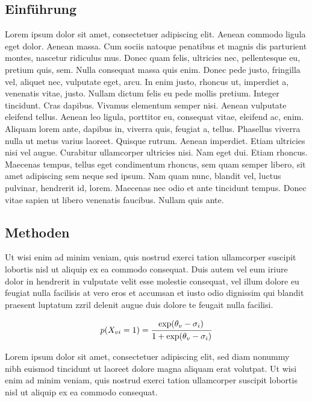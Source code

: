\documentclass[a1paper]{article}
\begin{document}
\begin{posterbox}
	\vspace{-10mm}
	\raggedright

	\section*{Einführung}
	Lorem ipsum dolor sit amet, consectetuer adipiscing elit. Aenean commodo ligula eget dolor. Aenean massa. Cum sociis natoque penatibus et magnis dis parturient montes, nascetur ridiculus mus. Donec quam felis, ultricies nec, pellentesque eu, pretium quis, sem. Nulla consequat massa quis enim. Donec pede justo, fringilla vel, aliquet nec, vulputate eget, arcu. In enim justo, rhoncus ut, imperdiet a, venenatis vitae, justo. Nullam dictum felis eu pede mollis pretium. Integer tincidunt. Cras dapibus. Vivamus elementum semper nisi. Aenean vulputate eleifend tellus. Aenean leo ligula, porttitor eu, consequat vitae, eleifend ac, enim. Aliquam lorem ante, dapibus in, viverra quis, feugiat a, tellus. Phasellus viverra nulla ut metus varius laoreet. Quisque rutrum. Aenean imperdiet. Etiam ultricies nisi vel augue. Curabitur ullamcorper ultricies nisi. Nam eget dui. Etiam rhoncus. Maecenas tempus, tellus eget condimentum rhoncus, sem quam semper libero, sit amet adipiscing sem neque sed ipsum. Nam quam nunc, blandit vel, luctus pulvinar, hendrerit id, lorem. Maecenas nec odio et ante tincidunt tempus. Donec vitae sapien ut libero venenatis faucibus. Nullam quis ante.
\end{posterbox}

\vfill

\begin{posterbox}
	\vspace{-10mm}
	\raggedright

	\section*{Methoden}
	Ut wisi enim ad minim veniam, quis nostrud exerci tation ullamcorper suscipit lobortis nisl ut aliquip ex ea commodo consequat. Duis autem vel eum iriure dolor in hendrerit in vulputate velit esse molestie consequat, vel illum dolore eu feugiat nulla facilisis at vero eros et accumsan et iusto odio dignissim qui blandit praesent luptatum zzril delenit augue duis dolore te feugait nulla facilisi.

	$$
	 p\!\left(X_{vi} = 1\right) = \frac{\exp\!\left(\theta_v - \sigma_i\right)\strut}
	 {\strut 1 + \exp\!\left(
	 \theta_v - \sigma_i\right)}
	$$

	Lorem ipsum dolor sit amet, consectetuer adipiscing elit, sed diam nonummy nibh euismod tincidunt ut laoreet dolore magna aliquam erat volutpat. Ut wisi enim ad minim veniam, quis nostrud exerci tation ullamcorper suscipit lobortis nisl ut aliquip ex ea commodo consequat.
\end{posterbox}
\end{document}
